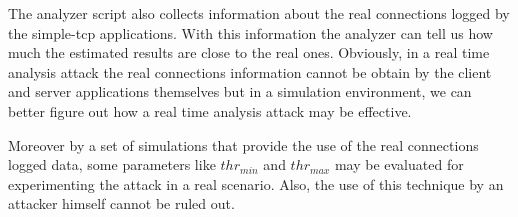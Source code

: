 The analyzer script also collects information about the
real connections logged by the simple-tcp applications. With this
information the analyzer can tell us how much the estimated results are
close to the real ones. Obviously, in a real time analysis attack the real connections
information cannot be obtain by the client and server applications themselves 
but in a simulation environment, we can better figure out how a real
time analysis attack may be effective.

 Moreover by a set of simulations
that provide the use of the real connections logged data, some
parameters like $thr_{min}$ and $thr_{max}$ may be evaluated for 
experimenting the attack in a real scenario. Also, the use of this technique
by an attacker himself cannot be ruled out. 
\newpage
